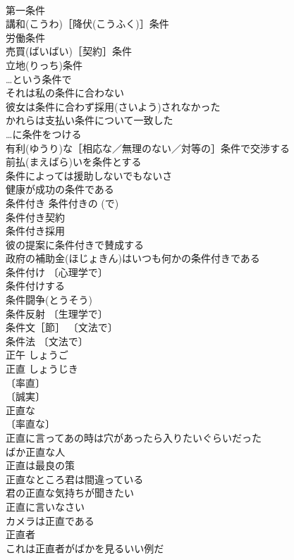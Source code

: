 \documentclass[8pt]{extreport}
\begin{document}
\begin{CJK}{UTF8}{min}
\\	第一条件 
\\	講和(こうわ)［降伏(こうふく)］条件 
\\	労働条件 
\\	売買(ばいばい)［契約］条件 
\\	立地(りっち)条件 
\\	…という条件で 
\\	それは私の条件に合わない 
\\	彼女は条件に合わず採用(さいよう)されなかった 
\\	かれらは支払い条件について一致した 
\\	…に条件をつける 
\\	有利(ゆうり)な［相応な／無理のない／対等の］条件で交渉する 
\\	前払(まえばら)いを条件とする 
\\	条件によっては援助しないでもないさ 
\\	健康が成功の条件である 
\\	条件付き 条件付きの (で) 
\\	条件付き契約 
\\	条件付き採用 
\\	彼の提案に条件付きで賛成する 
\\	政府の補助金(ほじょきん)はいつも何かの条件付きである 
\\	条件付け 〔心理学で〕
\\	条件付けする 
\\	条件闘争(とうそう) 
\\	条件反射 〔生理学で〕
\\	条件文［節］ 〔文法で〕
\\	条件法 〔文法で〕
\\	正午	しょうご	
\\	正直	しょうじき	
\\	〔率直〕
\\	〔誠実〕
\\	正直な 
\\	〔率直な〕
\\	正直に言ってあの時は穴があったら入りたいぐらいだった 
\\	ばか正直な人 
\\	正直は最良の策 
\\	正直なところ君は間違っている 
\\	君の正直な気持ちが聞きたい 
\\	正直に言いなさい 
\\	カメラは正直である 
\\	正直者 
\\	これは正直者がばかを見るいい例だ 

\end{CJK}
\end{document}
